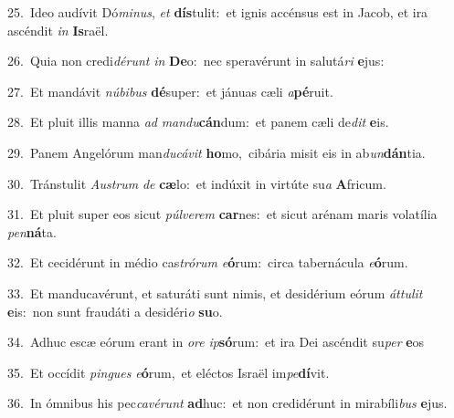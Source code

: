 {\numbfont\textcolor{\numbcolor}{25.}}~Ideo audívit Dó\-\textit{mi}\-\textit{nus}, \textit{et} \textbf{dís}\-tulit:~\star et ignis accénsus est in Jacob, et ira ascéndit \textit{in} \textbf{Is}\-raël.\par
{\numbfont\textcolor{\numbcolor}{26.}}~Quia non credi\-\textit{dé}\-\textit{runt} \textit{in} \textbf{De}\-o:~\star nec speravérunt in salutá\textit{ri} \textbf{e}\-jus:\par
{\numbfont\textcolor{\numbcolor}{27.}}~Et mandávit \textit{nú}\-\textit{bi}\textit{bus} \textbf{dé}\-super:~\star et jánuas cæli \textit{a}\-\textbf{pé}ruit.\par
{\numbfont\textcolor{\numbcolor}{28.}}~Et pluit illis manna \textit{ad} \textit{man}\-\textit{du}\textbf{cán}dum:~\star et panem cæli de\textit{dit} \textbf{e}\-is.\par
{\numbfont\textcolor{\numbcolor}{29.}}~Panem Angelórum man\-\textit{du}\-\textit{cá}\textit{vit} \textbf{ho}\-mo,~\star cibária misit eis in ab\-\textit{un}\-\textbf{dán}tia.\par
{\numbfont\textcolor{\numbcolor}{30.}}~Tránstulit \textit{Aus}\-\textit{trum} \textit{de} \textbf{cæ}\-lo:~\star et indúxit in virtúte su\textit{a} \textbf{A}\-fricum.\par
{\numbfont\textcolor{\numbcolor}{31.}}~Et pluit super eos sicut \textit{púl}\-\textit{ve}\textit{rem} \textbf{car}\-nes:~\star et sicut arénam maris volatília \textit{pen}\-\textbf{ná}ta.\par
{\numbfont\textcolor{\numbcolor}{32.}}~Et cecidérunt in médio cas\-\textit{tró}\-\textit{rum} \textit{e}\-\textbf{ó}rum:~\star circa tabernácula \textit{e}\-\textbf{ó}rum.\par
{\numbfont\textcolor{\numbcolor}{33.}}~Et manducavérunt, et saturáti sunt nimis, et desidérium eórum \textit{át}\-\textit{tu}\textit{lit} \textbf{e}\-is:~\star non sunt fraudáti a desidéri\textit{o} \textbf{su}\-o.\par
{\numbfont\textcolor{\numbcolor}{34.}}~Adhuc escæ eórum erant in \textit{o}\-\textit{re} \textit{ip}\-\textbf{só}rum:~\star et ira Dei ascéndit su\textit{per} \textbf{e}\-os\par
{\numbfont\textcolor{\numbcolor}{35.}}~Et occídit \textit{pin}\-\textit{gues} \textit{e}\-\textbf{ó}rum,~\star et eléctos Israël im\-\textit{pe}\-\textbf{dí}vit.\par
{\numbfont\textcolor{\numbcolor}{36.}}~In ómnibus his pec\-\textit{ca}\-\textit{vé}\textit{runt} \textbf{ad}\-huc:~\star et non credidérunt in mirabíli\textit{bus} \textbf{e}\-jus.\par
